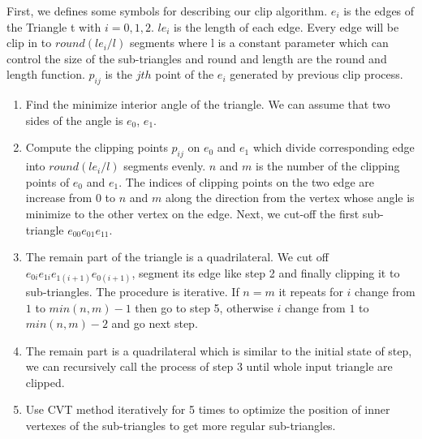 \documentclass[3p]{elsarticle}
\begin{document}
First, we defines some symbols for describing our clip algorithm. $e_i$ is the edges of the Triangle t with $i = 0, 1, 2$. $le_i$ is the length of each edge. Every edge will be clip in to $round(le_i / l)$ segments where l is a constant parameter which can control the size of the sub-triangles and round and length are the round and length function. $p_{ij}$ is the $jth$ point of the $e_i$ generated by previous clip process.
\begin{enumerate}
    \item Find the minimize interior angle of the triangle. We can assume that two sides of the angle is $e_0$, $e_1$.
    \item Compute the clipping points $p_{ij}$ on $e_0$ and $e_1$ which divide corresponding edge into $round(le_i / l)$ segments evenly. $n$ and $m$ is the number of the clipping points of $e_0$ and $e_1$. The indices of clipping points on the two edge are increase from $0$ to $n$ and $m$ along the direction from the vertex whose angle is minimize to the other vertex on the edge. Next, we cut-off the first sub-triangle $e_{00}e_{01}e_{11}$.
    \item The remain part of the triangle is a quadrilateral. We cut off $e_{0i}e_{1i}e_{1(i+1)}e_{0(i+1)}$, segment its edge like step 2 and finally clipping it to sub-triangles. The procedure is iterative. If $n = m$ it repeats for $i$ change from $1$ to $ min(n, m) - 1$ then go to step 5, otherwise $i$ change from $1$ to $min(n, m) - 2$ and go next step.
    \item The remain part is a quadrilateral which is similar to the initial state of step, we can recursively call the process of step 3 until whole input triangle are clipped.
    \item Use CVT method iteratively for 5 times to optimize the position of inner vertexes of the sub-triangles to get more regular sub-triangles.
\end{enumerate}
\end{document}
